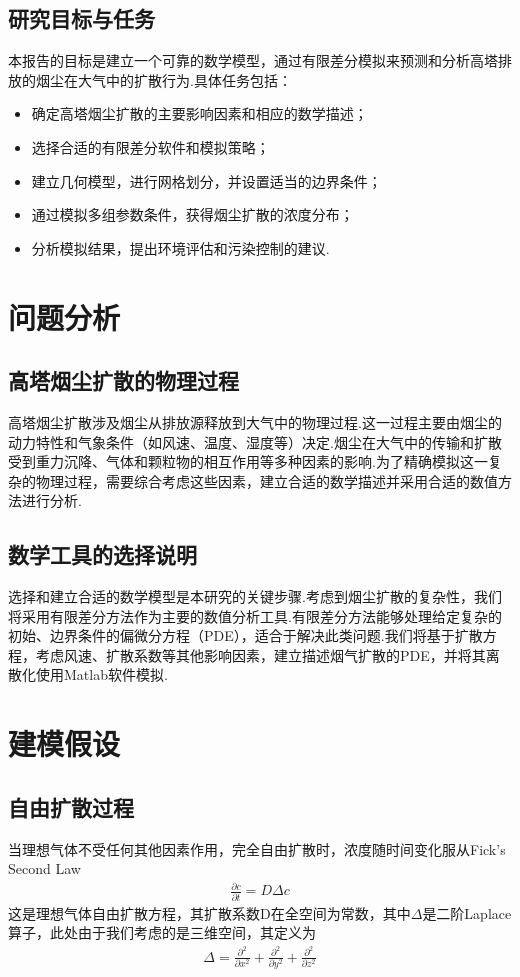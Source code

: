 \documentclass{article}
\begin{document}
	\subsection{研究目标与任务}
	本报告的目标是建立一个可靠的数学模型，通过有限差分模拟来预测和分析高塔排放的烟尘在大气中的扩散行为.具体任务包括：
	\begin{itemize}
		\item 确定高塔烟尘扩散的主要影响因素和相应的数学描述；
		\item 选择合适的有限差分软件和模拟策略；
		\item 建立几何模型，进行网格划分，并设置适当的边界条件；
		\item 通过模拟多组参数条件，获得烟尘扩散的浓度分布；
		\item 分析模拟结果，提出环境评估和污染控制的建议.
	\end{itemize}
	
	\section{问题分析}
	\subsection{高塔烟尘扩散的物理过程}
	高塔烟尘扩散涉及烟尘从排放源释放到大气中的物理过程.这一过程主要由烟尘的动力特性和气象条件（如风速、温度、湿度等）决定.烟尘在大气中的传输和扩散受到重力沉降、气体和颗粒物的相互作用等多种因素的影响.为了精确模拟这一复杂的物理过程，需要综合考虑这些因素，建立合适的数学描述并采用合适的数值方法进行分析.
	
	\subsection{数学工具的选择说明}
	选择和建立合适的数学模型是本研究的关键步骤.考虑到烟尘扩散的复杂性，我们将采用有限差分方法作为主要的数值分析工具.有限差分方法能够处理给定复杂的初始、边界条件的偏微分方程（PDE），适合于解决此类问题.我们将基于扩散方程，考虑风速、扩散系数等其他影响因素，建立描述烟气扩散的PDE，并将其离散化使用Matlab软件模拟.
	
	\section{建模假设}
	\subsection{自由扩散过程}\noindent
	当理想气体不受任何其他因素作用，完全自由扩散时，浓度随时间变化服从Fick's Second Law
	\begin{align*}
		\frac{\partial c}{\partial t} = D\Delta c
	\end{align*}
	这是理想气体自由扩散方程，其扩散系数D在全空间为常数，其中$\Delta$是二阶Laplace算子，此处由于我们考虑的是三维空间，其定义为
	\begin{align*}
		\Delta = \frac{\partial^2}{\partial x^2}+\frac{\partial^2}{\partial y^2}+\frac{\partial^2}{\partial z^2}
	\end{align*}
	
\end{document}
